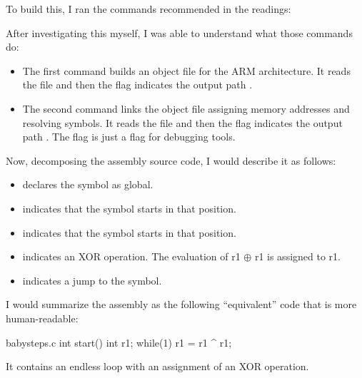 To build this, I ran the commands recommended in the readings:

\begin{terminal}
\end{terminal}

After investigating this myself, I was able to understand what those commands do:

\begin{itemize}
    \item The first command  builds an object file for the ARM architecture.
    It reads the file  and then the flag  indicates the output path .
    \item The second command  links the object file assigning memory addresses and resolving symbols.
    It reads the file  and then the flag  indicates the output path .
    The flag  is just a flag for debugging tools.
\end{itemize}

Now, decomposing the assembly source code, I would describe it as follows:
\begin{itemize}
    \item {} declares the symbol  as global.
    \item {} indicates that the symbol  starts in that position.
    \item {} indicates that the symbol  starts in that position.
    \item {} indicates an XOR operation. The evaluation of r1 \(\oplus\) r1 is assigned to r1.
    \item {} indicates a jump to the  symbol.
\end{itemize}

I would summarize the assembly as the following ``equivalent''  code that is more human-readable:

\begin{codebox}[c]{babysteps.c}
int start(){
    int r1;
    while(1){
        r1 = r1 ^ r1;
    }
}
\end{codebox}

It contains an endless loop with an assignment of an XOR operation.

